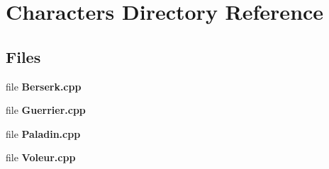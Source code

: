 \section{Characters Directory Reference}
\label{dir_2ffdef17cca9de07c93993d3906116c7}
\subsection*{Files}
\begin{DoxyCompactItemize}
\item 
file {\bf Berserk.\-cpp}
\item 
file {\bf Guerrier.\-cpp}
\item 
file {\bf Paladin.\-cpp}
\item 
file {\bf Voleur.\-cpp}
\end{DoxyCompactItemize}
